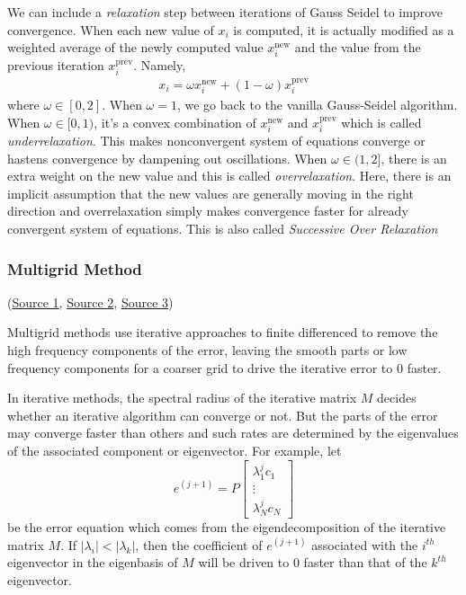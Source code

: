 \documentclass[12pt]{article}
\begin{document}
We can include a \textit{relaxation} step between iterations of Gauss Seidel to improve convergence. When each new value of $x_i$ is computed, it is actually modified as a weighted average of the newly computed value $x_i^{\text{new}}$ and the value from the previous iteration $x_i^{\text{prev}}$. Namely,
\begin{align*}
    x_i = \omega x_i^{\text{new}} + (1 - \omega)x_i^{\text{prev}}
\end{align*}
where $\omega \in [0, 2]$. When $\omega = 1$, we go back to the vanilla Gauss-Seidel algorithm. When $\omega \in [0, 1)$, it's a convex combination of $x_i^{\text{new}}$ and $x_i^{\text{prev}}$ which is called \textit{underrelaxation}. This makes nonconvergent system of equations converge or hastens convergence by dampening out oscillations. When $\omega \in (1, 2]$, there is an extra weight on the new value and this is called \textit{overrelaxation}. Here, there is an implicit assumption that the new values are generally moving in the right direction and overrelaxation simply makes convergence faster for already convergent system of equations. This is also called \textit{Successive Over Relaxation}



\subsubsection{Multigrid Method}
(\href{https://ocw.mit.edu/courses/16-920j-numerical-methods-for-partial-differential-equations-sma-5212-spring-2003/resources/lec7_notes/}{Source 1}, \href{https://math.mit.edu/classes/18.086/2006/am62.pdf}{Source 2}, \href{https://math.mit.edu/classes/18.086/2006/am63.pdf}{Source 3})

Multigrid methods use iterative approaches to finite differenced to remove the high frequency components of the error, leaving the smooth parts or low frequency components for a coarser grid to drive the iterative error to $0$ faster.

In iterative methods, the spectral radius of the iterative matrix $M$ decides whether an iterative algorithm can converge or not. But the parts of the error may converge faster than others and such rates are determined by the eigenvalues of the associated component or eigenvector. For example, let $$e^{(j + 1)}  = P\begin{bmatrix}
    \lambda_1^jc_1 \\
    \vdots \\
    \lambda_N^jc_N
\end{bmatrix}$$
be the error equation which comes from the eigendecomposition of the iterative matrix $M$. If $|\lambda_i| < |\lambda_k|$, then the coefficient of $e^{(j + 1)}$ associated with the $i^{th}$ eigenvector in the eigenbasis of $M$ will be driven to $0$ faster than that of the $k^{th}$ eigenvector.
\end{document}
